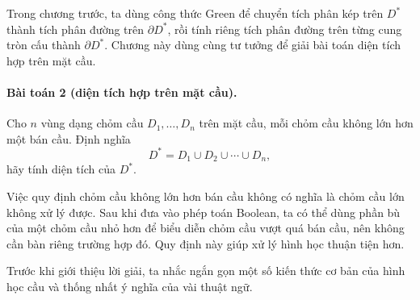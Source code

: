 \documentclass[11pt]{article}
\begin{document}
Trong chương trước, ta dùng công thức Green để chuyển tích phân kép trên
\(D^*\) thành tích phân đường trên \(\partial D^*\), rồi tính riêng tích phân
đường trên từng cung tròn cấu thành \(\partial D^*\). Chương này dùng cùng tư
tưởng để giải bài toán diện tích hợp trên mặt cầu.

\paragraph{Bài toán 2 (diện tích hợp trên mặt cầu).}
Cho \(n\) vùng dạng chỏm cầu \(D_1,\ldots,D_n\) trên mặt cầu, mỗi chỏm cầu không
lớn hơn một bán cầu. Định nghĩa
\[
  D^*=D_1\cup D_2\cup\cdots\cup D_n,
\]
hãy tính diện tích của \(D^*\).

Việc quy định chỏm cầu không lớn hơn bán cầu không có nghĩa là chỏm cầu lớn
không xử lý được. Sau khi đưa vào phép toán Boolean, ta có thể dùng phần bù của
một chỏm cầu nhỏ hơn để biểu diễn chỏm cầu vượt quá bán cầu, nên không cần bàn
riêng trường hợp đó. Quy định này giúp xử lý hình học thuận tiện hơn.

Trước khi giới thiệu lời giải, ta nhắc ngắn gọn một số kiến thức cơ bản của
hình học cầu và thống nhất ý nghĩa của vài thuật ngữ.
\end{document}
